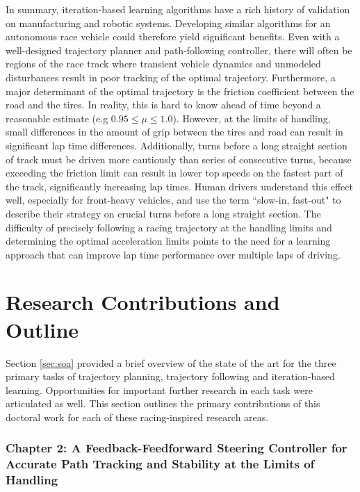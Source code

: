 In summary, iteration-based learning algorithms have a rich history of validation on manufacturing and robotic systems. Developing similar
algorithms for an autonomous race vehicle could therefore yield significant benefits. Even with a well-designed trajectory planner
 and path-following controller, there will often be regions of the race track where transient vehicle
 dynamics and unmodeled disturbances result in poor tracking of the optimal trajectory. Furthermore, a major determinant of the 
 optimal trajectory is the friction coefficient between the road and the tires. In reality, this is hard to know ahead
of time beyond a reasonable estimate (e.g $0.95 \leq \mu \leq 1.0$). However, at the limits of handling, small differences in the amount of grip
between the tires and road can result in significant lap time differences. Additionally, turns before a long straight section of track
must be driven more cautiously than series of consecutive turns, because exceeding the friction limit can result in lower top speeds
on the fastest part of the track, significantly increasing lap times. Human drivers
understand this effect well, especially for front-heavy vehicles, and use the term ``slow-in, fast-out" to describe their strategy on crucial turns
before a long straight section. The difficulty of precisely following a racing trajectory at the handling limits and determining the optimal acceleration limits
points to the need for a learning approach that can improve lap time performance over multiple laps of driving.
 
\section{Research Contributions and Outline}
Section \ref{sec:soa} provided a brief overview of the state of the art for the three primary tasks of trajectory planning, trajectory following and
iteration-based learning. Opportunities for important further research in each task were articulated as well. 
This section outlines the primary contributions of this doctoral work for each of these racing-inspired research areas. 

\subsubsection{Chapter 2: A Feedback-Feedforward Steering Controller for Accurate Path Tracking and Stability at the Limits of Handling}

